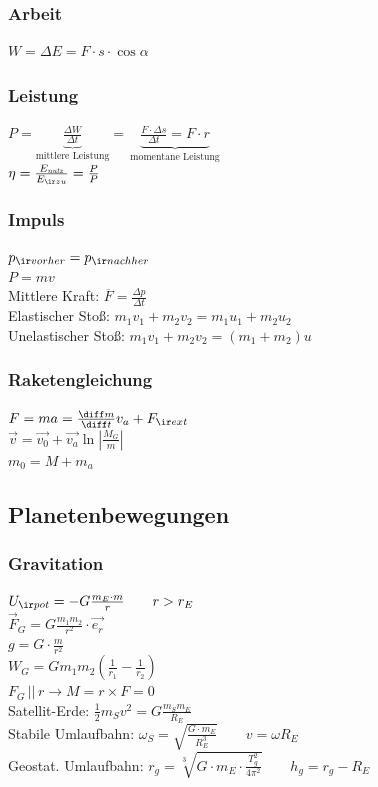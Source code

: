 \documentclass[german]{latex4ei/latex4ei_sheet}
\begin{document}
\subsubsection{Arbeit}
$W=\Delta E=F\cdot s \cdot \cos \alpha$
\subsubsection{Leistung}
$P=
\underbrace{\frac{\Delta W}{\Delta t}}_{\text{mittlere Leistung}} 
= \, \underbrace{\frac{F\cdot \Delta s}{\Delta t}=F\cdot r}_{\text{momentane Leistung}}$\\
$\eta=\frac{E_{\it nutz}}{E_{\ir zu}}=\frac{P}{P}$
\subsubsection{Impuls}
$p_{\ir vorher}=p_{\ir nachher}$\\
$P=mv$\\
Mittlere Kraft: $\overline{F}=\frac{\Delta p}{\Delta t}$\\
Elastischer Stoß: $m_1v_1+m_2v_2=m_1u_1+m_2u_2$\\
Unelastischer Stoß: $m_1v_1+m_2v_2=(m_1+m_2)u$
\subsubsection{Raketengleichung}
$F=ma=\frac{\diff m}{\diff t}v_a+F_{\ir ext}$\\
$\vec{v}=\vec{v_0}+\vec{v_a}\ln | \frac{M_G}{m} | $\\
$m_0=M+m_a$
\subsection{Planetenbewegungen}
\subsubsection{Gravitation}
$U_{\ir pot}=-G\frac{m_E\cdot m}{r} \qquad r>r_E$\\
$\vec{F}_G=G\frac{m_1m_2}{r^2}\cdot \vec{e_r}$\\
$g=G\cdot \frac{m}{r^2}$\\
$W_G=Gm_1m_2(\frac{1}{r_1}-\frac{1}{r_2})$\\
$F_G \, || \, r \rightarrow M=r\times F=0$\\

Satellit-Erde: $\frac{1}{2}m_Sv^2=G\frac{m_Sm_E}{R_E}$ \\
Stabile Umlaufbahn: $\omega_S=\sqrt{\frac{G\cdot m_E}{R_E^3}}\qquad v=\omega R_E$\\
Geostat. Umlaufbahn: $r_g=\sqrt[3]{G\cdot m_E \cdot \frac{T_g^2}{4\pi^2}} \qquad h_g=r_g-R_E$
\end{document}
